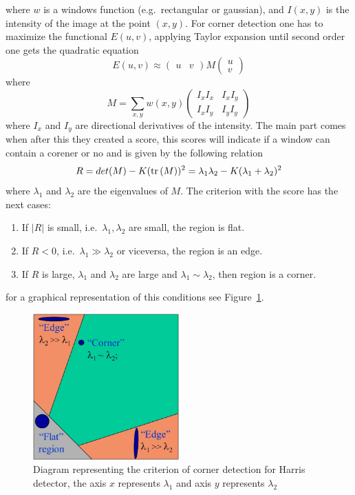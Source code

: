 \begin{itemize}
where $w$ is a windows function (e.g.\ rectangular or gaussian), and $I(x,y)$ is the intensity of the image at the point $(x,y)$. For corner detection one has to maximize the functional $E(u,v)$, applying Taylor expansion until second order one gets the quadratic equation 
$$
E(u,v)\approx
 \left(
\begin{matrix}
u &  v
\end{matrix}
\right)
M
\left( 
\begin{matrix}
u\\
v
\end{matrix}
\right)
$$
where
$$
M = \sum_{x,y}w(x,y)
\left(\begin{matrix}
I_xI_x & I_xI_y \\
I_xI_y & I_yI_y
\end{matrix}
\right)
$$
where $I_x$ and $I_y$ are directional derivatives of the intensity. The main part comes when after this they created a score, this scores will indicate if a window can contain a corener or no and is given by the following relation
\begin{equation}
\label{eq:C2S4E10}
R=det(M)-K(\operatorname{tr}{(M)})^2=\lambda_1\lambda_2-K(\lambda_1+\lambda_2)^2
\end{equation}
where $\lambda_1$ and $\lambda_2$ are the eigenvalues of $M$. The criterion with the score has the next cases:
\begin{enumerate}
\item If $|R|$ is small, i.e.\ $\lambda_1,\lambda_2$ are small, the region is flat.
\item If $R<0$, i.e.\ $\lambda_1\gg\lambda_2$ or viceversa, the region is an edge.
\item If $R$ is large, $\lambda_1$ and $\lambda_2$ are large and $\lambda_1\sim\lambda_2$, then region is a corner. 
\end{enumerate}
for a graphical representation of this conditions see Figure~\ref{fig:harris_region}.

\begin{figure}[h!]
\centering
\includegraphics[width = 0.5\textwidth]{./Diagrams/harris_region.png}
\caption{Diagram representing the criterion of corner detection for Harris detector, the axis $x$ represents $\lambda_1$ and axis $y$ represents $\lambda_2$}
\label{fig:harris_region}
\end{figure}


\end{itemize}
